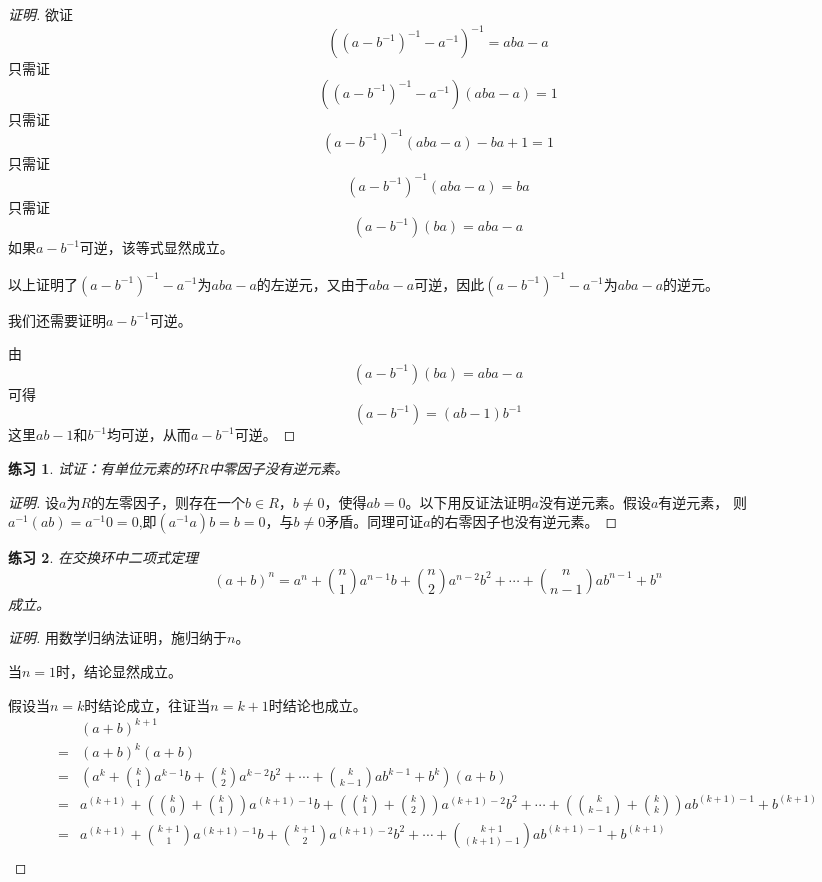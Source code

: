 \documentclass{article}
\newtheorem{Exercise}{练习}
\begin{document}
\begin{CJK*}{UTF8}{gbsn}
\begin{proof}[证明]
  欲证
  \[((a-b^{-1})^{-1}-a^{-1})^{-1}=aba-a\]
  只需证
  \[((a-b^{-1})^{-1}-a^{-1})(aba-a)=1\]
  只需证
  \[(a-b^{-1})^{-1}(aba-a)-ba+1=1\]
  只需证
  \[(a-b^{-1})^{-1}(aba-a)=ba\]
  只需证
  \[(a-b^{-1})(ba)=aba-a\]
  如果$a-b^{-1}$可逆，该等式显然成立。

  以上证明了$(a-b^{-1})^{-1}-a^{-1}$为$aba-a$的左逆元，又由于$aba-a$可逆，因此$(a-b^{-1})^{-1}-a^{-1}$为$aba-a$的逆元。


  我们还需要证明$a-b^{-1}$可逆。

  由
  \[(a-b^{-1})(ba)=aba-a\]
  可得
  \[(a-b^{-1})=(ab-1)b^{-1}\]
这里$ab-1$和$b^{-1}$均可逆，从而$a-b^{-1}$可逆。
\end{proof}
\begin{Exercise}
  试证：有单位元素的环$R$中零因子没有逆元素。
\end{Exercise}
\begin{proof}[证明]
  设$a$为$R$的左零因子，则存在一个$b\in R$，$b\neq 0$，使得$ab=0$。以下用反证法证明$a$没有逆元素。假设$a$有逆元素，
  则$a^{-1}(ab)=a^{-1}0=0$,即$(a^{-1}a)b=b=0$，与$b\neq 0$矛盾。同理可证$a$的右零因子也没有逆元素。
\end{proof}
\begin{Exercise}
  在交换环中二项式定理
\[(a+b)^n=a^n+\binom{n}{1}a^{n-1}b+\binom{n}{2}a^{n-2}b^2+\cdots+\binom{n}{n-1}ab^{n-1}+b^n\]
  成立。
\end{Exercise}
\begin{proof}[证明]
用数学归纳法证明，施归纳于$n$。

当$n=1$时，结论显然成立。

假设当$n=k$时结论成立，往证当$n=k+1$时结论也成立。
\begin{align*}
  &(a+b)^{k+1}\\
  =&(a+b)^k(a+b)\\
  =&(a^k+\binom{k}{1}a^{k-1}b+\binom{k}{2}a^{k-2}b^2+\cdots+\binom{k}{k-1}ab^{k-1}+b^k)(a+b)\\
  =&a^{(k+1)}+(\binom{k}{0}+\binom{k}{1})a^{(k+1)-1}b+(\binom{k}{1}+\binom{k}{2})a^{(k+1)-2}b^2+\cdots+(\binom{k}{k-1}+\binom{k}{k})ab^{(k+1)-1}+b^{(k+1)}\\
  =&a^{(k+1)}+\binom{k+1}{1}a^{(k+1)-1}b+\binom{k+1}{2}a^{(k+1)-2}b^2+\cdots+\binom{k+1}{(k+1)-1}ab^{(k+1)-1}+b^{(k+1)}\\
\end{align*}
\end{proof}


\end{CJK*}
\end{document}
